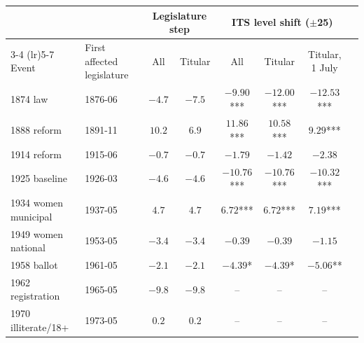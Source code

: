 \begin{tabular}{llcccccc}
\toprule
 & & \multicolumn{2}{c}{Legislature step} & \multicolumn{3}{c}{ITS level shift ($\pm$25)} \\
\cmidrule(lr){3-4} \cmidrule(lr){5-7}
Event & First affected legislature & All & Titular & All & Titular & Titular, 1 July \\
\midrule
1874 law & 1876-06 & $-4.7$ & $-7.5$ & $-9.90$*** & $-12.00$*** & $-12.53$*** \\
1888 reform & 1891-11 & $10.2$ & $6.9$ & $11.86$*** & $10.58$*** & $9.29$*** \\
1914 reform & 1915-06 & $-0.7$ & $-0.7$ & $-1.79$ & $-1.42$ & $-2.38$ \\
1925 baseline & 1926-03 & $-4.6$ & $-4.6$ & $-10.76$*** & $-10.76$*** & $-10.32$*** \\
1934 women municipal & 1937-05 & $4.7$ & $4.7$ & $6.72$*** & $6.72$*** & $7.19$*** \\
1949 women national & 1953-05 & $-3.4$ & $-3.4$ & $-0.39$ & $-0.39$ & $-1.15$ \\
1958 ballot & 1961-05 & $-2.1$ & $-2.1$ & $-4.39$* & $-4.39$* & $-5.06$** \\
1962 registration & 1965-05 & $-9.8$ & $-9.8$ & -- & -- & -- \\
1970 illiterate/18+ & 1973-05 & $0.2$ & $0.2$ & -- & -- & -- \\
\bottomrule
\end{tabular}
